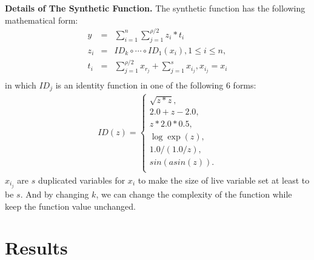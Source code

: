 \documentclass[final,leqno,onefignum,onetabnum]{siamart}
\begin{document}
{\bf Details of The Synthetic Function. }
The synthetic function has the following mathematical form:
\begin{eqnarray*}
y &=& \sum\limits_{i=1}^{n} \sum\limits_{j=1}^{\rho/2} z_i * t_i \\ 
z_i &=& ID_k \circ \cdots \circ ID_1 (x_i), 1 \le i \le n, \\
t_i &=& \sum\limits_{j=1}^{\rho/2} x_{r_j} + \sum\limits_{j=1}^{s} x_{i_j}, x_{i_j} = x_i \\
\end{eqnarray*}
in which $ID_j$ is an identity function in one of the following $6$ forms:
\begin{eqnarray*}
ID(z) = 
\begin{cases}
\sqrt{z * z}, \\
2.0 + z - 2.0, \\
z * 2.0 * 0.5, \\
\log \exp(z), \\
1.0 / (1.0 / z), \\
sin(asin(z)). \\
\end{cases}
\end{eqnarray*}
$x_{i_j}$ are $s$ duplicated variables for $x_i$ to make the size of live variable set at least to be $s$. And by changing $k$, we can change the complexity of the function while keep the function value unchanged.




\section*{Results}
\end{document}
